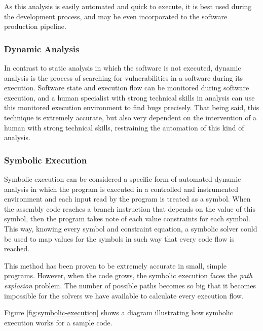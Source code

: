 As this analysis is easily automated and quick to execute, it is best used during the development process, and may be even incorporated to the software production pipeline.

\subsubsection{Dynamic Analysis}

In contrast to static analysis in which the software is not executed, dynamic analysis is the process of searching for vulnerabilities in a software during its execution. Software state and execution flow can be monitored during software execution, and a human specialist with strong technical skills in analysis can use this monitored execution environment to find bugs precisely. That being said, this technique is extremely accurate, but also very dependent on the intervention of a human with strong technical skills, restraining the automation of this kind of analysis.

\subsubsection{Symbolic Execution}

Symbolic execution can be considered a specific form of automated dynamic analysis in which the program is executed in a controlled and instrumented environment and each input read by the program is treated as a symbol. When the assembly code reaches a branch instruction that depends on the value of this symbol, then the program takes note of each value constraints for each symbol. This way, knowing every symbol and constraint equation, a symbolic solver could be used to map values for the symbols in such way that every code flow is reached.

This method has been proven to be extremely accurate in small, simple programs. However, when the code grows, the symbolic execution faces the \textit{path explosion} problem. The number of possible paths becomes so big that it becomes impossible for the solvers we have available to calculate every execution flow.

Figure \ref{fig:symbolic-execution} shows a diagram illustrating how symbolic execution works for a sample code.

